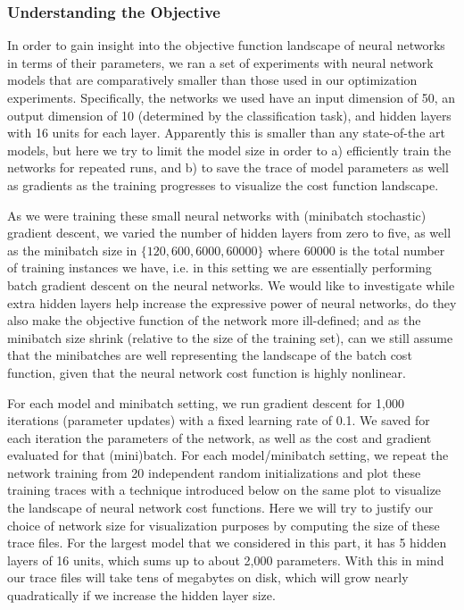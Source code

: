 \subsubsection*{Understanding the Objective}

In order to gain insight into the objective function landscape of neural networks
in terms of their parameters, we ran a set of experiments with neural network models
that are comparatively smaller than those used in our optimization experiments.
Specifically, the networks we used have an input dimension of 50, an output dimension
of 10 (determined by the classification task), and hidden layers with 16 units for each
layer. Apparently this is smaller than any state-of-the art models, but here we try to 
limit the model size in order to a) efficiently train the networks for repeated runs, and
b) to save the trace of model parameters as well as gradients as the training progresses
to visualize the cost function landscape.

As we were training these small neural networks with (minibatch stochastic) gradient 
descent, we varied the number of hidden layers from zero to five,
as well as the minibatch size in $\{120,600,6000,60000\}$ where 60000 is the total 
number of training instances we have, i.e. in this setting we are essentially performing 
batch gradient descent on the neural networks. We would like to investigate while
extra hidden layers help increase the expressive power of neural networks, do they 
also make the objective function of the network more ill-defined; and as the minibatch
size shrink (relative to the size of the training set), can we still assume that 
the minibatches are well representing the landscape of the batch cost function, given
that the neural network cost function is highly nonlinear.

For each model and minibatch setting, we run gradient descent for 1,000 iterations 
(parameter updates) with a fixed learning rate of 0.1. We saved for each iteration the
parameters of the network, as well as the cost and gradient evaluated for that
(mini)batch. For each model/minibatch setting, we repeat the network training from
20 independent random initializations and plot these training traces with a technique
introduced below on the same plot to visualize the landscape of neural network cost
functions. Here we will try to justify our choice of network size for visualization 
purposes by computing the size of these trace files. For the largest model that we
considered in this part, it has 5 hidden layers of 16 units, which sums up to about
2,000 parameters. With this in mind our trace files will take tens of megabytes on disk,
which will grow nearly quadratically if we increase the hidden layer size.

